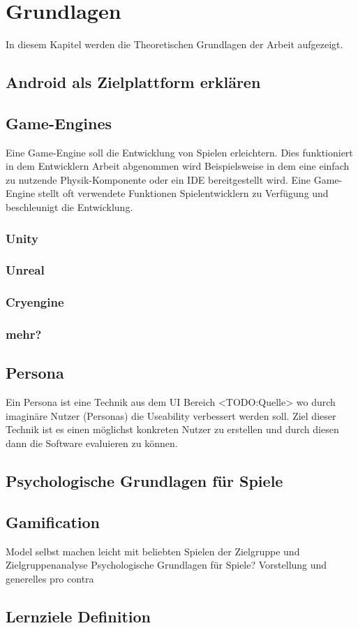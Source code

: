 \section{Grundlagen}
	In diesem Kapitel werden die Theoretischen Grundlagen der Arbeit aufgezeigt.
\subsection{Android als Zielplattform erklären}
\subsection{Game-Engines}
	Eine Game-Engine soll die Entwicklung von Spielen erleichtern. Dies funktioniert in dem Entwicklern Arbeit abgenommen wird Beispielsweise in dem eine einfach zu nutzende Physik-Komponente oder ein \gls{IDE} bereitgestellt wird. Eine Game-Engine stellt oft verwendete Funktionen Spielentwicklern zu Verfügung und beschleunigt die Entwicklung.
	\subsubsection{Unity}
	\subsubsection{Unreal}
	\subsubsection{Cryengine}
	\subsubsection{mehr?}
\subsection{Persona}\label{ssec:persona}
	Ein Persona ist eine Technik aus dem UI Bereich <TODO:Quelle> wo durch imaginäre Nutzer (Personas) die Useability verbessert werden soll. Ziel dieser Technik ist es einen möglichst konkreten Nutzer zu erstellen und durch diesen dann die Software evaluieren zu können.
\subsection{Psychologische Grundlagen für Spiele}
\subsection{Gamification}
	Model selbst machen leicht mit beliebten Spielen der Zielgruppe und Zielgruppenanalyse
	Psychologische Grundlagen für Spiele?
	Vorstellung und generelles pro contra
\subsection{Lernziele Definition}
